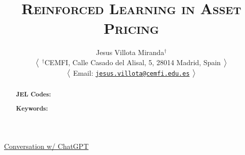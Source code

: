 \documentclass[12pt,a4paper]{article}
\title{\textsc{
{\LARGE Reinforced Learning in Asset Pricing}
}}
\author[1]{
{ \bx \bx \bx Jesus Villota Miranda$^{\dagger}$
}

\bx 
{\small
$\big{<}$
\noindent $^{\dagger}$CEMFI, Calle Casado del Alisal, 5, 28014 Madrid, Spain 
$\big{>}$

$\big{<}$
Email: \href{jesus.villota@cemfi.edu.es}{\texttt{jesus.villota@cemfi.edu.es}}
$\big{>}$
}
}
\date{}  %
\begin{document}
\maketitle
\thispagestyle{empty}  %


\begin{abstract}
%

\bigskip
\noindent\textbf{JEL Codes:} 

\noindent\textbf{Keywords:}
\end{abstract}


\newpage
\tableofcontents
\thispagestyle{empty}  %


\newpage
\setcounter{page}{1}

%
%
%


\noindent \Vhrulefill 

{\centering \href{https://chatgpt.com/c/66f3b1d1-9448-800d-8d38-85f812d77b9e}{Conversation w/ ChatGPT} \par}

\noindent \Vhrulefill

















%
%
%
\end{document}
